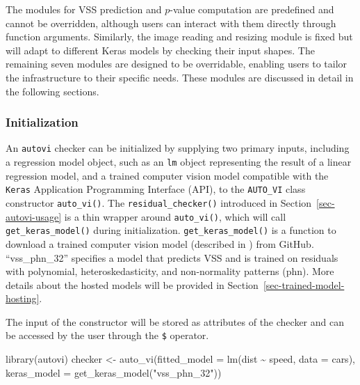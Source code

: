 \documentclass[
doublespace,
  times]{anzsauth}
\newenvironment{Shaded}{\begin{snugshade}}{\end{snugshade}}
\newcommand{\AttributeTok}[1]{\textcolor[rgb]{0.40,0.45,0.13}{#1}}
\newcommand{\FunctionTok}[1]{\textcolor[rgb]{0.28,0.35,0.67}{#1}}
\newcommand{\NormalTok}[1]{\textcolor[rgb]{0.00,0.23,0.31}{#1}}
\newcommand{\OtherTok}[1]{\textcolor[rgb]{0.00,0.23,0.31}{#1}}
\newcommand{\SpecialCharTok}[1]{\textcolor[rgb]{0.37,0.37,0.37}{#1}}
\newcommand{\StringTok}[1]{\textcolor[rgb]{0.13,0.47,0.30}{#1}}
\begin{document}
The modules for VSS prediction and \(p\)-value computation are
predefined and cannot be overridden, although users can interact with
them directly through function arguments. Similarly, the image reading
and resizing module is fixed but will adapt to different Keras models by
checking their input shapes. The remaining seven modules are designed to
be overridable, enabling users to tailor the infrastructure to their
specific needs. These modules are discussed in detail in the following
sections.

\subsubsection{Initialization}\label{initialization}

An \texttt{autovi} checker can be initialized by supplying two primary
inputs, including a regression model object, such as an \texttt{lm}
object representing the result of a linear regression model, and a
trained computer vision model compatible with the \texttt{Keras}
\citep{chollet2015keras} Application Programming Interface (API), to the
\texttt{AUTO\_VI} class constructor \texttt{auto\_vi()}. The
\texttt{residual\_checker()} introduced in
Section~\ref{sec-autovi-usage} is a thin wrapper around
\texttt{auto\_vi()}, which will call \texttt{get\_keras\_model()} during
initialization. \texttt{get\_keras\_model()} is a function to download a
trained computer vision model (described in \citet{li2024automated})
from GitHub. ``vss\_phn\_32'' specifies a model that predicts VSS and is
trained on residuals with polynomial, heteroskedasticity, and
non-normality patterns (phn). More details about the hosted models will
be provided in Section~\ref{sec-trained-model-hosting}.

The input of the constructor will be stored as attributes of the checker
and can be accessed by the user through the \texttt{\$} operator.

\begin{Shaded}
\begin{Highlighting}[]
\FunctionTok{library}\NormalTok{(autovi)}
\NormalTok{checker }\OtherTok{\textless{}{-}} \FunctionTok{auto\_vi}\NormalTok{(}\AttributeTok{fitted\_model =} \FunctionTok{lm}\NormalTok{(dist }\SpecialCharTok{\textasciitilde{}}\NormalTok{ speed, }\AttributeTok{data =}\NormalTok{ cars), }
                   \AttributeTok{keras\_model =} \FunctionTok{get\_keras\_model}\NormalTok{(}\StringTok{"vss\_phn\_32"}\NormalTok{))}
\end{Highlighting}
\end{Shaded}
\end{document}
